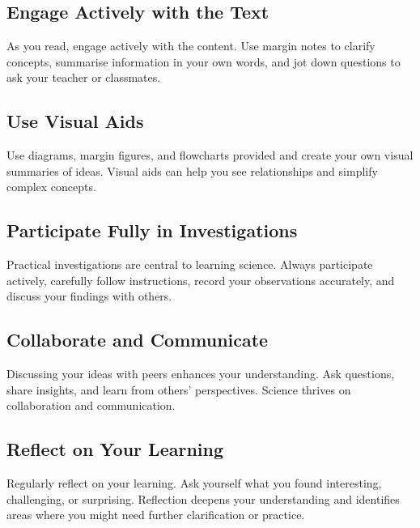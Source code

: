 \subsection{Engage Actively with the Text}

As you read, engage actively with the content. Use margin notes to clarify concepts, summarise information in your own words, and jot down questions to ask your teacher or classmates.


\subsection{Use Visual Aids}

Use diagrams, margin figures, and flowcharts provided and create your own visual summaries of ideas. Visual aids can help you see relationships and simplify complex concepts.

\subsection{Participate Fully in Investigations}

Practical investigations are central to learning science. Always participate actively, carefully follow instructions, record your observations accurately, and discuss your findings with others.


\subsection{Collaborate and Communicate}

Discussing your ideas with peers enhances your understanding. Ask questions, share insights, and learn from others' perspectives. Science thrives on collaboration and communication.

\subsection{Reflect on Your Learning}

Regularly reflect on your learning. Ask yourself what you found interesting, challenging, or surprising. Reflection deepens your understanding and identifies areas where you might need further clarification or practice.

